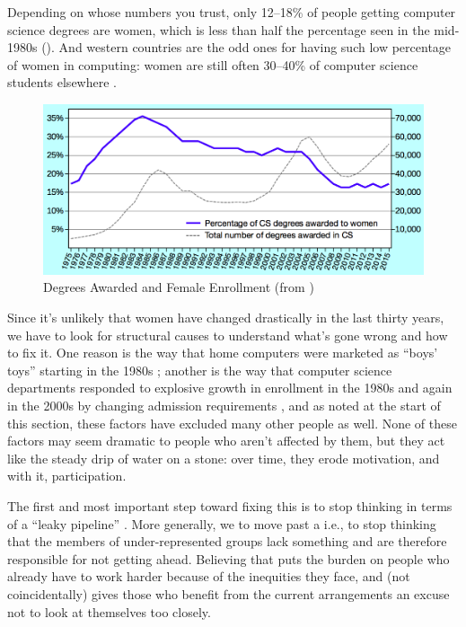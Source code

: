 Depending on whose numbers you trust, only 12--18\% of people getting
computer science degrees are women, which is less than half the
percentage seen in the mid-1980s ().  And
western countries are the odd ones for having such low percentage of
women in computing: women are still often 30--40\% of computer science
students elsewhere \cite{Galp2002,Varm2015}.

\begin{figure}
\centering
\includegraphics{../docs/fig/enrollment.png}
\caption{Degrees Awarded and Female Enrollment (from \cite{Robe2017})}
\label{f:motivation-gender}
\end{figure}

Since it's unlikely that women have changed drastically in the last
thirty years, we have to look for structural causes to understand
what's gone wrong and how to fix it.  One reason is the way that home
computers were marketed as ``boys' toys'' starting in the 1980s
\cite{Marg2003}; another is the way that computer science departments
responded to explosive growth in enrollment in the 1980s and again in
the 2000s by changing admission requirements \cite{Robe2017}, and as
noted at the start of this section, these factors have excluded many
other people as well.  None of these factors may seem dramatic to
people who aren't affected by them, but they act like the steady drip
of water on a stone: over time, they erode motivation, and with it,
participation.

The first and most important step toward fixing this is to stop
thinking in terms of a ``leaky pipeline'' \cite{Mill2015}.  More
generally, we to move past a 
i.e., to stop thinking that the members of under-represented groups
lack something and are therefore responsible for not getting ahead.
Believing that puts the burden on people who already have to work
harder because of the inequities they face, and (not coincidentally)
gives those who benefit from the current arrangements an excuse not to
look at themselves too closely.

